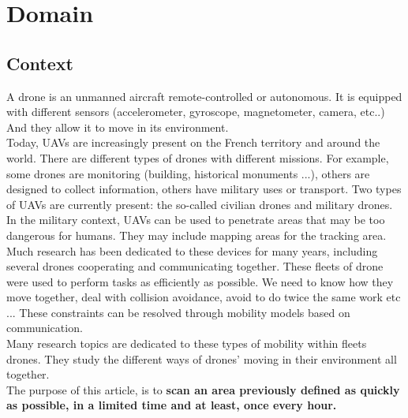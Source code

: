 \part{Domain}

\chapter{Context}

A drone is an unmanned aircraft remote-controlled or autonomous. It is equipped with different sensors (accelerometer, gyroscope, magnetometer, camera, etc..) And they allow it to move in its environment.\\

Today, UAVs are increasingly present on the French territory and around the world. There are different types of drones with different missions. For example, some drones are monitoring (building, historical monuments ...), others are designed to collect information, others have military uses or transport. Two types of UAVs are currently present: the so-called civilian drones and military drones. In the military context, UAVs can be used to penetrate areas that may be too dangerous for humans. They may include mapping areas for the tracking area.\\

Much research has been dedicated to these devices for many years, including several drones cooperating and communicating together. These fleets of drone were used to perform tasks as efficiently as possible. We need to know how they move together, deal with collision avoidance, avoid to do twice the same work etc ... These constraints can be resolved through mobility models based on communication.\\
Many research topics are dedicated to these types of mobility within fleets drones. They study the different ways of drones' moving in their environment all together.\\

The purpose of this article, is to \textbf{scan an area previously defined as quickly as possible, in a limited time and at least, once every hour.}\\

